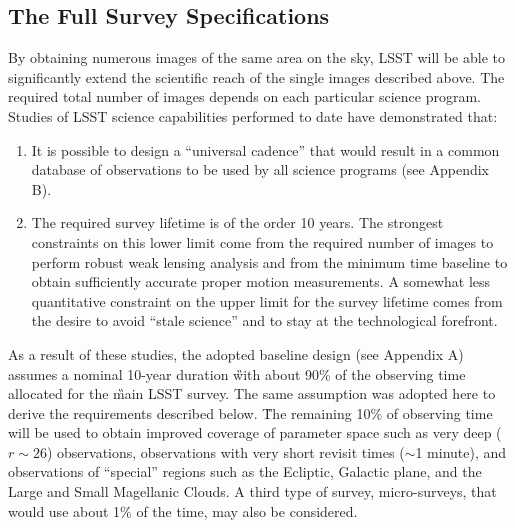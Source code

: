 \subsection{          The Full Survey Specifications                   }


By obtaining numerous images of the same area on the sky, LSST will be able
to significantly extend the scientific reach of the single images described
above.  The required total number of images depends on each particular science
program.  Studies of LSST science capabilities performed to date have
demonstrated that:
\begin{enumerate}
\item It is possible to design a ``universal cadence'' that would result in
a common database of observations to be used by all science programs (see
Appendix B).
\item The required survey lifetime is of the order 10 years. The strongest
constraints on this lower limit come from the required number of images to
perform robust weak lensing analysis and from the minimum time baseline to
obtain sufficiently accurate proper motion measurements. A somewhat less
quantitative constraint on the upper limit for the survey lifetime comes
from the desire to avoid ``stale science'' and to stay at the
technological forefront.
\end{enumerate}

As a result of these studies, the adopted baseline design (see Appendix A)
assumes a nominal 10-year duration \G{with about 90\% of the observing
time allocated} for the \G{main} LSST survey. The same assumption
was adopted here to derive the requirements described below.  
\G{The remaining 10\% of observing time will be used to obtain improved coverage
of parameter space such as very deep ($r\sim26$) observations, observations with
very short revisit times ($\sim$1 minute), and observations of  ``special'' regions
such as the Ecliptic, Galactic plane, and the Large and Small Magellanic Clouds.
A third type of survey, micro-surveys, that would use about 1\% of the time,
may also be considered.}


